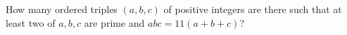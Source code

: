 How many ordered triples $\left(a,b,c\right)$ of positive integers are there such that at least two of $a,b,c$ are prime and $abc=11\left(a+b+c\right)$?